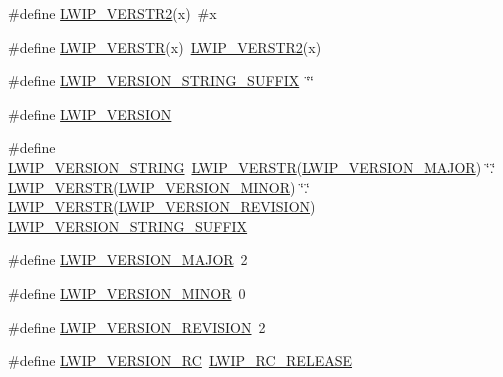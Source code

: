 \begin{DoxyCompactItemize}
\item 
\#define \hyperlink{group__lwip__version_gaf32777134eea478cc10bada0629a9e7e}{L\+W\+I\+P\+\_\+\+V\+E\+R\+S\+T\+R2}(x)~\#x
\item 
\#define \hyperlink{group__lwip__version_ga6dcc57b1d685cae569b2c9c9461de0e2}{L\+W\+I\+P\+\_\+\+V\+E\+R\+S\+TR}(x)~\hyperlink{group__lwip__version_gaf32777134eea478cc10bada0629a9e7e}{L\+W\+I\+P\+\_\+\+V\+E\+R\+S\+T\+R2}(x)
\item 
\#define \hyperlink{group__lwip__version_ga548fd1ff32bddf18074d284b794a3983}{L\+W\+I\+P\+\_\+\+V\+E\+R\+S\+I\+O\+N\+\_\+\+S\+T\+R\+I\+N\+G\+\_\+\+S\+U\+F\+F\+IX}~\char`\"{}\char`\"{}
\item 
\#define \hyperlink{group__lwip__version_ga0a0d322fad0a67aa5b8f1b8c9dfcfe59}{L\+W\+I\+P\+\_\+\+V\+E\+R\+S\+I\+ON}
\item 
\#define \hyperlink{group__lwip__version_gab47e87bc38eef94486db402813183ba7}{L\+W\+I\+P\+\_\+\+V\+E\+R\+S\+I\+O\+N\+\_\+\+S\+T\+R\+I\+NG}~\hyperlink{group__lwip__version_ga6dcc57b1d685cae569b2c9c9461de0e2}{L\+W\+I\+P\+\_\+\+V\+E\+R\+S\+TR}(\hyperlink{group__lwip__version_ga4308c06ef36496e00c798d96d7d03246}{L\+W\+I\+P\+\_\+\+V\+E\+R\+S\+I\+O\+N\+\_\+\+M\+A\+J\+OR}) \char`\"{}.\char`\"{} \hyperlink{group__lwip__version_ga6dcc57b1d685cae569b2c9c9461de0e2}{L\+W\+I\+P\+\_\+\+V\+E\+R\+S\+TR}(\hyperlink{group__lwip__version_ga1e596388c15ba81e753c5633fad1c034}{L\+W\+I\+P\+\_\+\+V\+E\+R\+S\+I\+O\+N\+\_\+\+M\+I\+N\+OR}) \char`\"{}.\char`\"{} \hyperlink{group__lwip__version_ga6dcc57b1d685cae569b2c9c9461de0e2}{L\+W\+I\+P\+\_\+\+V\+E\+R\+S\+TR}(\hyperlink{group__lwip__version_ga0a57983df1b199cf39a2e6a2d90e3d50}{L\+W\+I\+P\+\_\+\+V\+E\+R\+S\+I\+O\+N\+\_\+\+R\+E\+V\+I\+S\+I\+ON}) \hyperlink{group__lwip__version_ga548fd1ff32bddf18074d284b794a3983}{L\+W\+I\+P\+\_\+\+V\+E\+R\+S\+I\+O\+N\+\_\+\+S\+T\+R\+I\+N\+G\+\_\+\+S\+U\+F\+F\+IX}
\item 
\#define \hyperlink{group__lwip__version_ga4308c06ef36496e00c798d96d7d03246}{L\+W\+I\+P\+\_\+\+V\+E\+R\+S\+I\+O\+N\+\_\+\+M\+A\+J\+OR}~2
\item 
\#define \hyperlink{group__lwip__version_ga1e596388c15ba81e753c5633fad1c034}{L\+W\+I\+P\+\_\+\+V\+E\+R\+S\+I\+O\+N\+\_\+\+M\+I\+N\+OR}~0
\item 
\#define \hyperlink{group__lwip__version_ga0a57983df1b199cf39a2e6a2d90e3d50}{L\+W\+I\+P\+\_\+\+V\+E\+R\+S\+I\+O\+N\+\_\+\+R\+E\+V\+I\+S\+I\+ON}~2
\item 
\#define \hyperlink{group__lwip__version_gac1dc92d8f453a98560de7e2e00a221a1}{L\+W\+I\+P\+\_\+\+V\+E\+R\+S\+I\+O\+N\+\_\+\+RC}~\hyperlink{group__lwip__version_ga375ee868e76ed7c458cdf249387bd469}{L\+W\+I\+P\+\_\+\+R\+C\+\_\+\+R\+E\+L\+E\+A\+SE}

\end{DoxyCompactItemize}
